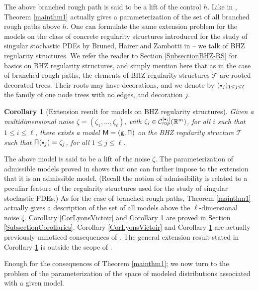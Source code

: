 \documentclass[JEP,XML,SOM,Unicode,published]{cedram}
\newcommand{\sbullet}{{\scriptscriptstyle\bullet}}
\newcommand{\scbullet}{{\raisebox{1pt}{$\sbullet$}}}
\theoremstyle{plain}
\newtheorem{cor}[thm]{Corollary}
\theoremstyle{definition}
\newcommand{\bbR}{\mathbb{R}}
\newcommand{\mcC}{\mathcal{C}}
\begin{document}
The above branched rough path is said to be a lift of the control $h$. Like in \cite{TZ18}, Theorem \ref{mainthm1} actually gives a parameterization of the set of all branched rough paths above $h$. One can formulate the same extension problem for the models on the class of concrete regularity structures introduced for the study of singular stochastic PDEs by Bruned, Hairer and Zambotti in \cite{BHZ} -- we talk of BHZ regularity structures. We refer the reader to Section \ref{SubsectionBHZ-RS} for basics on BHZ regularity structures, and simply mention here that as in the case of branched rough paths, the elements of BHZ regularity structures $\mathscr{T}$ are rooted decorated trees. Their roots may have decorations, and we denote by $(\scbullet_j)_{1\leq j\leq \ell}$ the family of one node trees with no edges, and decoration $j$.

\begin{cor}[Extension result for models on BHZ regularity structures] \label{CorExtension}
Given a multidimensional noise $\zeta=(\zeta_1,\dots,\zeta_\ell)$, with $\zeta_i\in \mcC^{\vert\sbullet_i\vert}_\textrm{\emph{rap}}(\bbR^m)$, for all $i$ such that $1\leq i\leq\ell$, there exists a model $\sf M=(g,\Pi)$ on the BHZ regularity structure $\mathscr{T}$ such that ${\sf \Pi}(\scbullet_j)=\zeta_j$, for all $1\leq j\leq\ell$.
\end{cor}

The above model is said to be a lift of the noise $\zeta$. The parameterization of admissible models proved in \cite{BH} shows that one can further impose to the extension that it is an admissible model. (Recall the notion of admissibility is related to a peculiar feature of the regularity structures used for the study of singular stochastic PDEs.) As for the case of branched rough paths, Theorem \ref{mainthm1} actually gives a description of the set of all models above the $\ell$-dimensional noise $\zeta$. Corollary \ref{CorLyonsVictoir} and Corollary \ref{CorExtension} are proved in Section \ref{SubsectionCorollaries}. Corollary \ref{CorLyonsVictoir} and Corollary \ref{CorExtension} are actually previously unnoticed consequences of \cite[Th.\,21]{BH}. The general extension result stated in Corollary \ref{CorExtension} is outside the scope of \cite[Th.\,21]{BH}.

Enough for the consequences of Theorem \ref{mainthm1}; we now turn to the problem of the parameterization of the space of modeled distributions associated with a given model.
\end{document}
